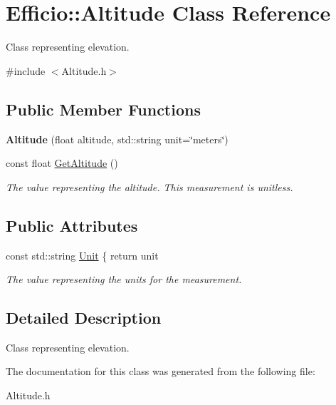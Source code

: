 \hypertarget{class_efficio_1_1_altitude}{}\section{Efficio\+:\+:Altitude Class Reference}
\label{class_efficio_1_1_altitude}


Class representing elevation.  




{\ttfamily \#include $<$Altitude.\+h$>$}

\subsection*{Public Member Functions}
\begin{DoxyCompactItemize}
\item 
{\bfseries Altitude} (float altitude, std\+::string unit=\char`\"{}meters\char`\"{})\hypertarget{class_efficio_1_1_altitude_a361d649596480ca17bda900089964614}{}\label{class_efficio_1_1_altitude_a361d649596480ca17bda900089964614}

\item 
const float \hyperlink{class_efficio_1_1_altitude_a590bee96f63b187ee2e82bf936825a7e}{Get\+Altitude} ()\hypertarget{class_efficio_1_1_altitude_a590bee96f63b187ee2e82bf936825a7e}{}\label{class_efficio_1_1_altitude_a590bee96f63b187ee2e82bf936825a7e}

\begin{DoxyCompactList}\small\item\em The value representing the altitude. This measurement is unitless. \end{DoxyCompactList}\end{DoxyCompactItemize}
\subsection*{Public Attributes}
\begin{DoxyCompactItemize}
\item 
const std\+::string \hyperlink{class_efficio_1_1_altitude_ae04b64196161d3d59ed4dfe2af97a77f}{Unit} \{ return unit\hypertarget{class_efficio_1_1_altitude_ae04b64196161d3d59ed4dfe2af97a77f}{}\label{class_efficio_1_1_altitude_ae04b64196161d3d59ed4dfe2af97a77f}

\begin{DoxyCompactList}\small\item\em The value representing the units for the measurement. \end{DoxyCompactList}\end{DoxyCompactItemize}


\subsection{Detailed Description}
Class representing elevation. 

The documentation for this class was generated from the following file\+:\begin{DoxyCompactItemize}
\item 
Altitude.\+h\end{DoxyCompactItemize}
